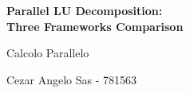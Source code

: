 \documentclass[12pt, a4paper, openright, oneside]{book}
\begin{document}
\begin{titlepage}
    \begin{center}
        \vspace*{1cm}
        
        \LARGE
        \textbf{Parallel LU Decomposition: \\ Three Frameworks Comparison}
        
        \vspace{0.5cm}
		\Large
        Calcolo Parallelo
        
        \vspace{1.5cm}
        \large
        Cezar Angelo Sas - 781563
                
    \end{center}
\end{titlepage}


\tableofcontents





\end{document}
